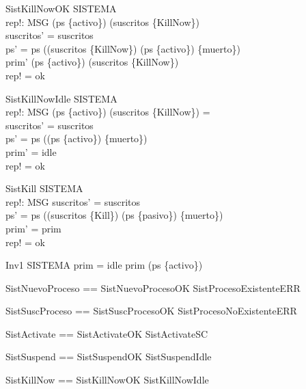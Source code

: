 \begin{schema}{SistKillNowOK}
  \Delta SISTEMA\\
  rep!: MSG
\where
  \dom  (ps \rres  \{activo\}) \setminus  \dom  (suscritos \rres  \{KillNow\}) \neq  \emptyset\\
  suscritos' = suscritos\\
  ps' = ps \oplus  (\dom  (suscritos \rres  \{KillNow\}) \cap  \dom  (ps \rres  \{activo\}) \cross  \{muerto\})\\
  prim' \in  \dom  (ps \rres  \{activo\}) \setminus  \dom  (suscritos \rres  \{KillNow\})\\
  rep! = ok
\end{schema}

\begin{schema}{SistKillNowIdle}
  \Delta SISTEMA\\
  rep!: MSG
\where
  \dom  (ps \rres  \{activo\}) \setminus  \dom  (suscritos \rres  \{KillNow\}) = \emptyset\\
  suscritos' = suscritos\\
  ps' = ps \oplus  (\dom  (ps \rres  \{activo\}) \cross  \{muerto\})\\
  prim' = idle\\
  rep! = ok
\end{schema}

\begin{schema}{SistKill}
  \Delta SISTEMA\\
  rep!: MSG
\where
  suscritos' = suscritos\\
  ps' = ps \oplus  (\dom  (suscritos \rres  \{Kill\}) \cap  \dom  (ps \rres  \{pasivo\}) \cross  \{muerto\})\\
  prim' = prim\\
  rep! = ok
\end{schema}

\begin{schema}{Inv1}
  SISTEMA
\where
  prim = idle \lor  prim \in  \dom  (ps \rres  \{activo\})
\end{schema}

\begin{zed}
SistNuevoProceso == SistNuevoProcesoOK \lor  SistProcesoExistenteERR
\end{zed}

\begin{zed}
SistSuscProceso == SistSuscProcesoOK \lor  SistProcesoNoExistenteERR
\end{zed}

\begin{zed}
SistActivate == SistActivateOK \lor  SistActivateSC
\end{zed}

\begin{zed}
SistSuspend == SistSuspendOK \lor  SistSuspendIdle
\end{zed}

\begin{zed}
SistKillNow == SistKillNowOK \lor  SistKillNowIdle
\end{zed}



